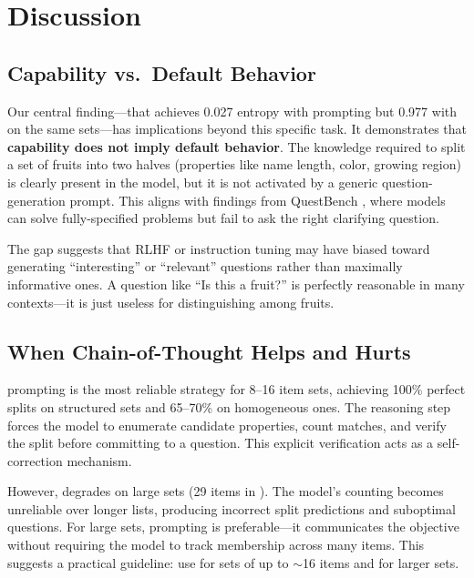\section{Discussion}
\label{sec:discussion}

\subsection{Capability vs.\ Default Behavior}

Our central finding---that \gptfull achieves 0.027 entropy with \basic prompting but 0.977 with \chainofthought on the same sets---has implications beyond this specific task.
It demonstrates that \textbf{capability does not imply default behavior}.
The knowledge required to split a set of fruits into two halves (properties like name length, color, growing region) is clearly present in the model, but it is not activated by a generic question-generation prompt.
This aligns with findings from QuestBench \citep{li2025questbench}, where models can solve fully-specified problems but fail to ask the right clarifying question.

The gap suggests that RLHF or instruction tuning may have biased \gptfull toward generating ``interesting'' or ``relevant'' questions rather than maximally informative ones.
A question like ``Is this a fruit?'' is perfectly reasonable in many contexts---it is just useless for distinguishing among fruits.

\subsection{When Chain-of-Thought Helps and Hurts}

\chainofthought prompting is the most reliable strategy for 8--16 item sets, achieving 100\% perfect splits on structured sets and 65--70\% on homogeneous ones.
The reasoning step forces the model to enumerate candidate properties, count matches, and verify the split before committing to a question.
This explicit verification acts as a self-correction mechanism.

However, \chainofthought degrades on large sets (29 items in \bigbench).
The model's counting becomes unreliable over longer lists, producing incorrect split predictions and suboptimal questions.
For large sets, \explicit prompting is preferable---it communicates the objective without requiring the model to track membership across many items.
This suggests a practical guideline: use \chainofthought for sets of up to $\sim$16 items and \explicit for larger sets.

